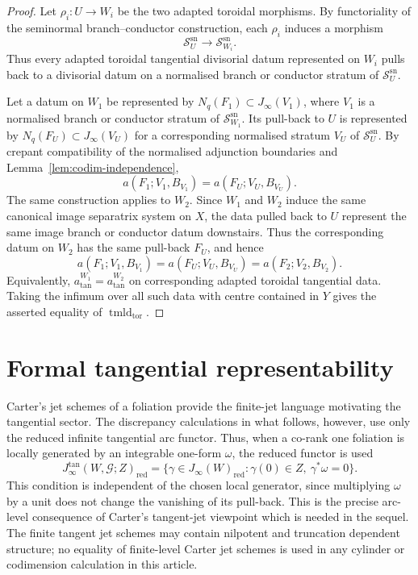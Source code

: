 \documentclass[11pt]{amsart}
\numberwithin{equation}{section}
\theoremstyle{plain}
\theoremstyle{definition}
\newcommand{\sn}{\mathrm{sn}}
\newcommand{\red}{\mathrm{red}}
\newcommand{\tmld}{\operatorname{tmld}}
\newcommand{\cG}{\mathcal G}
\newcommand{\sS}{\mathscr S}
\begin{document}
\begin{proof}
Let $\rho_i:U\to W_i$ be the two adapted toroidal morphisms.  By
functoriality of the seminormal branch--conductor construction, each
$\rho_i$ induces a morphism
\[
\sS_U^{\sn}\longrightarrow \sS_{W_i}^{\sn}.
\]
Thus every adapted toroidal tangential divisorial datum represented on
$W_i$ pulls back to a divisorial datum on a normalised branch or conductor
stratum of $\sS_U^{\sn}$.

Let a datum on $W_1$ be represented by $N_q(F_1)\subset J_\infty(V_1)$,
where $V_1$ is a normalised branch or conductor stratum of
$\sS_{W_1}^{\sn}$.  Its pull-back to $U$ is represented by
$N_q(F_U)\subset J_\infty(V_U)$ for a corresponding normalised stratum
$V_U$ of $\sS_U^{\sn}$.  By crepant compatibility of the normalised
adjunction boundaries and Lemma~\ref{lem:codim-independence},
\[
a(F_1;V_1,B_{V_1})=a(F_U;V_U,B_{V_U}).
\]
The same construction applies to $W_2$.  Since $W_1$ and $W_2$ induce the
same canonical image separatrix system on $X$, the data pulled back to $U$
represent the same image branch or conductor datum downstairs.  Thus the
corresponding datum on $W_2$ has the same pull-back $F_U$, and hence
\[
a(F_1;V_1,B_{V_1})=a(F_U;V_U,B_{V_U})=a(F_2;V_2,B_{V_2}).
\]
Equivalently, $a_{\tan}^{W_1}=a_{\tan}^{W_2}$ on corresponding adapted
toroidal tangential data.  Taking the infimum over all such data with centre
contained in $Y$ gives the asserted equality of $\tmld_{\mathrm{tor}}$.
\end{proof}

 

\section{Formal tangential representability}
\label{sec:formal}

Carter's jet schemes of a foliation \cite{Carter,CarterThesis} provide the
finite-jet language motivating the tangential sector.  The discrepancy
calculations in what follows, however, use only the reduced infinite tangential arc
functor.  Thus, when a co-rank one foliation is locally generated by an
integrable one-form $\omega$, the reduced functor is used
\[
J_\infty^{\tan}(W,\cG;Z)_{\red}
=
\{\gamma\in J_\infty(W)_{\red}:\gamma(0)\in Z,\ \gamma^*\omega=0\}.
\]
This condition is independent of the chosen local generator, since
multiplying $\omega$ by a unit does not change the vanishing of its pull-back.
This is the precise arc-level consequence of Carter's tangent-jet viewpoint
which is needed in the sequel.  The finite tangent jet schemes may contain
nilpotent and truncation dependent structure; no equality of finite-level
Carter jet schemes is used in any cylinder or codimension calculation in this
article.
\end{document}
